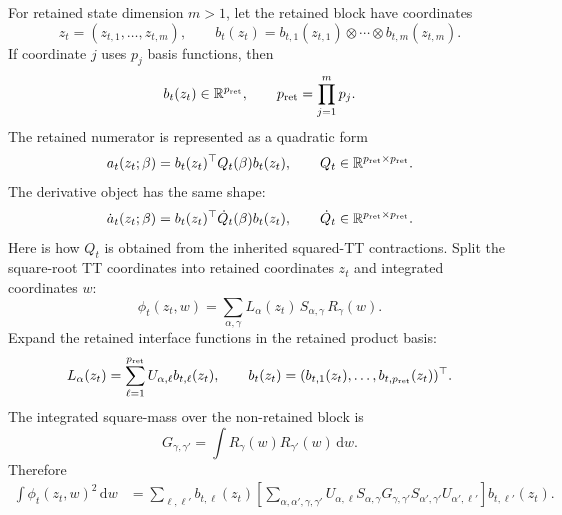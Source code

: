 \documentclass[11pt]{article}
\numberwithin{equation}{section}
\newcommand{\R}{\mathbb R}
\newcommand{\dd}{\,\mathrm d}
\begin{document}
For retained state dimension \(m>1\), let the retained block have coordinates
\begin{equation}
    z_t=(z_{t,1},\ldots,z_{t,m}),
    \qquad
    b_t(z_t)=b_{t,1}(z_{t,1})\otimes\cdots\otimes b_{t,m}(z_{t,m}).
    \label{eq:p24-p23-md1}
\end{equation}
If coordinate \(j\) uses \(p_j\) basis functions, then
\begin{equation}
    b_t(z_t)\in\R^{p_{\rm ret}},
    \qquad
    p_{\rm ret}=\prod_{j=1}^m p_j.
    \label{eq:p24-p23-md2}
\end{equation}
The retained numerator is represented as a quadratic form
\begin{equation}
    a_t(z_t;\beta)
    =
    b_t(z_t)^\top Q_t(\beta)b_t(z_t),
    \qquad
    Q_t\in\R^{p_{\rm ret}\times p_{\rm ret}}.
    \label{eq:p24-p23-md3}
\end{equation}
The derivative object has the same shape:
\begin{equation}
    \dot a_t(z_t;\beta)
    =
    b_t(z_t)^\top \dot Q_t(\beta)b_t(z_t),
    \qquad
    \dot Q_t\in\R^{p_{\rm ret}\times p_{\rm ret}}.
    \label{eq:p24-p23-md4}
\end{equation}
Here is how \(Q_t\) is obtained from the inherited squared-TT contractions.
Split the square-root TT coordinates into retained coordinates \(z_t\) and
integrated coordinates \(w\):
\begin{equation}
    \phi_t(z_t,w)
    =
    \sum_{\alpha,\gamma}
    L_\alpha(z_t)\,S_{\alpha,\gamma}\,R_\gamma(w).
    \label{eq:p24-p23-md4a}
\end{equation}
Expand the retained interface functions in the retained product basis:
\begin{equation}
    L_\alpha(z_t)
    =
    \sum_{\ell=1}^{p_{\rm ret}} U_{\alpha,\ell}b_{t,\ell}(z_t),
    \qquad
    b_t(z_t)=(b_{t,1}(z_t),\ldots,b_{t,p_{\rm ret}}(z_t))^\top.
    \label{eq:p24-p23-md4b}
\end{equation}
The integrated square-mass over the non-retained block is
\begin{equation}
    G_{\gamma,\gamma'}
    =
    \int R_\gamma(w)R_{\gamma'}(w)\dd w.
    \label{eq:p24-p23-md4c}
\end{equation}
Therefore
\begin{equation}
\begin{aligned}
    \int\phi_t(z_t,w)^2\dd w
    &=
    \sum_{\ell,\ell'}
    b_{t,\ell}(z_t)
    \left[
    \sum_{\alpha,\alpha',\gamma,\gamma'}
    U_{\alpha,\ell}S_{\alpha,\gamma}
    G_{\gamma,\gamma'}
    S_{\alpha',\gamma'}U_{\alpha',\ell'}
    \right]
    b_{t,\ell'}(z_t).
\end{aligned}
    \label{eq:p24-p23-md4d}
\end{equation}
\end{document}
